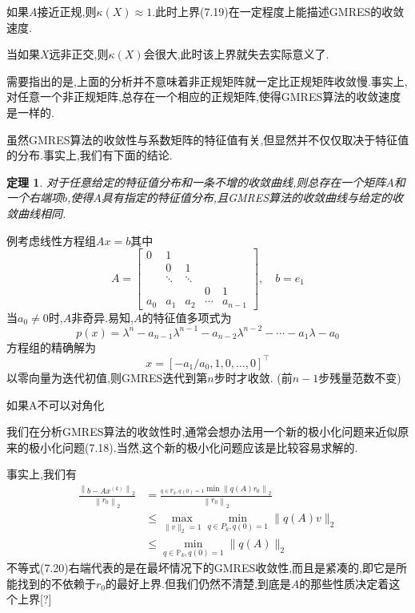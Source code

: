 \documentclass[notheorems,serif]{beamer}
\renewcommand{\normalsize}{\wuhao}
\newcommand{\wuhao}{\fontsize{10.5pt}{\baselineskip}\selectfont}
\newcommand{\hei}[1]{{\HEI#1}}
\newtheorem{theorem}{\hei{定理}}
\begin{document}
\begin{frame}
\qquad 如果$A$接近正规,则$\kappa(X) \approx 1$.此时上界(7.19)在一定程度上能描述GMRES的收敛速度.

\qquad 当如果$X$远非正交,则$\kappa(X)$会很大,此时该上界就失去实际意义了.

\qquad 需要指出的是,上面的分析并不意味着非正规矩阵就一定比正规矩阵收敛慢.事实上,对任意一个非正规矩阵,总存在一个相应的正规矩阵,使得GMRES算法的收敛速度是一样的.

\qquad 虽然GMRES算法的收敛性与系数矩阵的特征值有关,但显然并不仅仅取决于特征值的分布.事实上,我们有下面的结论.

\begin{theorem}
对于任意给定的特征值分布和一条不增的收敛曲线,则总存在一个矩阵$A$和一个右端项$b$,使得$A$具有指定的特征值分布,且GMRES算法的收敛曲线与给定的收敛曲线相同.
\end{theorem}
\end{frame}

\begin{frame}
{\color{blue}例}\quad 考虑线性方程组$A x=b$其中
$$
A=\left[\begin{array}{ccccc}{0} & {1} & {} & {} \\ {} & {0} & {1} \\ {} & {\ddots} & {\ddots} & {} \\ {} & {} & {} & {0} & {1} \\ {a_{0}} & {a_{1}} & {a_{2}} & {\cdots} & {a_{n-1}}\end{array}\right], \quad b=e_{1}
$$
当$a_{0} \neq 0$时,$A$非奇异.易知,$A$的特征值多项式为
$$
p(x)=\lambda^{n}-a_{n-1} \lambda^{n-1}-a_{n-2} \lambda^{n-2}-\cdots-a_{1} \lambda-a_{0}
$$
方程组的精确解为
$$
x=\left[-a_{1} / a_{0}, 1,0, \ldots, 0\right]^{\top}
$$
以零向量为迭代初值,则GMRES迭代到第$n$步时才收敛. (前$n-1$步残量范数不变)
\end{frame}


\begin{frame}


{\color{blue}\Large 如果A不可以对角化}

\quad

\normalsize

我们在分析GMRES算法的收敛性时,通常会想办法用一个新的极小化问题来近似原来的极小化问题(7.18).当然,这个新的极小化问题应该是比较容易求解的.

事实上,我们有
$$
\begin{aligned} 
\frac{\left\|b-A x^{(k)}\right\|_{2}}{\left\|r_{0}\right\|_{2}} &=\frac{_{q \in \mathbb{P}_{k}, q(0)=1}{\min }\left\|q(A) r_{0}\right\|_{2}}{\left\|r_{0}\right\|_{2}} \\ 
& \leq \max _{\|v\|_{2}=1} \min _{q \in P_{k}, q(0)=1}\|q(A) v\|_{2} \\
& \leq \min _{q \in \mathbb{P}_{k}, q(0)=1}\|q(A)\|_{2} \end{aligned}
$$
不等式(7.20)右端代表的是在最坏情况下的GMRES收敛性,而且是紧凑的,即它是所能找到的不依赖于$r_{0}$的最好上界.但我们仍然不清楚,到底是$A$的那些性质决定着这个上界[?]
\end{frame}
\end{document}
